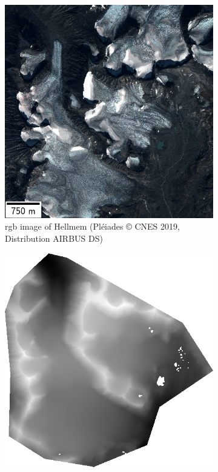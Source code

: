 \begin{figure}
    \centering
    \begin{subfigure}[t]{0.48\linewidth}
        \flushleft
        \includegraphics[width=\linewidth]{Images/Chap_6/miniature_Hellmem.png}
        \caption{\acrshort{rgb} image of Hellmem (Pléiades © CNES 2019, Distribution AIRBUS DS)}
        \label{fig:miniature_Hellmem_rgb}
    \end{subfigure}\hfill
    \begin{subfigure}[t]{0.48\linewidth}
        \flushright
        \includegraphics[width=\linewidth]{Images/Chap_6/miniature_Hellmem_gt.png}

\end{subfigure}
\end{figure}
